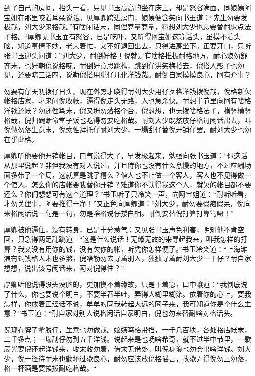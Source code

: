 \documentclass[12pt,UTF8]{ctexbook}
\begin{document}
{{{到了自己的房间，抬头一看，只见书玉高高的坐在床上，却是怒容满面，同娘姨阿宝姐在那里咬着耳朵说话。见厚卿跨进房门，娘姨便含笑向书玉道：“先生勿要发极哉，刘大少来格哉。”有啥闲话末，同俚商量商量，料想刘大少也总要替耐想点法子格。“厚卿见书玉面有怒容，已是吃吓，又听得阿宝姐这等话头，虽摸不着头脑，知道事情不妙，老大着忙，又不好退回出去，只得进房坐下。正要开口，只听张书玉迎头问道：”刘大少，耐倒好格！倪就是有啥格推扳耐格地方，耐心浪勿舒齐末，也好朝倪说格啘，耐倒好意思跳槽，跳到仔洪笑梅搭去，倪搭人影子也勿见，还要瞎三话四，说勒倪搭用脱仔几化洋钱哉。耐倒自家摸摸良心，阿有介事？

勿要有仔天呒拨仔日头。现在外势才晓得耐刘大少用仔歹格洋钱拨倪哉，倪格新欠帐格店家，才来问倪收帐，逼得倪走头无路，人也急杀快。耐想半节里向阿有啥格洋钱还帐？勿还俚笃末，倪又坍勿落格个台。倪想想，也无拨啥格法子，横竖横竖格哉，倪归碗断命堂子饭也吃得勿要吃格哉。耐刘大少既然放仔格句闲话出去，叫倪做勿落生意末，倪索性拜托仔耐刘大少，一塌刮仔替倪开销仔罢，耐刘大少也勿在乎此格。

厚卿听他要他开销帐目，口气说得大了，早发极起来，勉强向张书玉道：“你这话从那里说起？非但我没有对人说过，并且待你也没有什么怠慢的地方，不过应酬场面多带了一个局，这就算是跳了槽么？倌人也不止做一个客人，客人也不见得做一个倌人，怎么你的店帐要我替你开销？难道你不认得我这个人，就欠的帐目都不要还么？你们想想可有这个道理？”书玉听了只冷笑一声，向阿宝姐道：“耐听听看，才勿关俚事，阿要推得干净！”又正色向厚卿道：“刘大少，耐勿要假痴假呆，倪向来格闲话说一句是一句，勿是啥格说仔搂白相。耐倒要替倪打算打算笃嗫！”

厚卿被他逼住，没有转身，已是十分惹气；又见张书玉声色利害，明知他不肯空回，只急得两足乱跳道：“这是什么说话！无缘无故的来寻起我来，叫我怎样的打算？我又没有用你的钱，没有欠你的帐，听凭你怎样便了。”书玉冷笑道：“上海滩浪有铜钱格人末也多煞，倪啥勒勿去寻着别人，独独寻着耐刘大少一干仔？耐自家想想，说出该号闲话来，阿对倪得住？”

厚卿听他说得没头没脑的，更加摸不着缘故，只是干着急，口中嚷道：“我倒底说了什么，你也要说个明白，不要半吞半吐，弄得人糊里糊涂。依着你的心上，要我怎样，你放着正经话不说，单单的同我转起大远的圈子来，我可知道你是个什么主意？”书玉道：“耐自家对别人说格闲话自家明白，倪也勿来替耐啥对格话头。

倪现在牌子拿脱仔，生意也勿做哉。娘姨笃格带挡，一千几百块，各处格店帐末，二千多点；一塌刮仔勿到五千洋钱。说起来是也呒啥希奇，就不过半中节里，一歇辰光要倪还起洋钱来，收末收勿着，借末无借处，叫倪身浪也勿会出啥洋钱。刘大少，倪一径待耐末也朆坏过歇良心，耐勿应该放倪格谣言，故歇弄得倪勿上勿落，格一杯酒是要挨拨耐吃格哉。“

}}}
\end{document}
